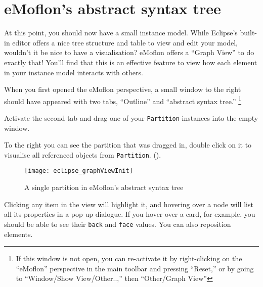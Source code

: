 \newpage
\section{eMoflon's abstract syntax tree}
\genHeader

At this point, you should now have a small instance model. While Eclipse's built-in editor offers a nice tree structure and table to view and edit your model,
wouldn't it be nice to have a visualisation? eMoflon offers a ``Graph View'' to do exactly that! You'll find that this is an effective
feature to view how each element in your instance model interacts with others.

\begin{stepbystep}

\item When you first opened the eMoflon perspective, a small window to the right should have appeared with two tabs, ``Outline'' and
``abstract syntax tree.'' \footnote{If this window is not open, you can re-activate it by right-clicking on the ``eMoflon'' perspective in the main toolbar and pressing
``Reset,'' or by going to ``Window/Show View/Other..,'' then ``Other/Graph View''} 

\item Activate the second tab and drag one of your \texttt{Partition} instances into the empty window. 

\item To the right you can see the partition that was dragged in, double click on it to visualise all referenced objects from \texttt{Partition}.
().

\vspace{0.5cm}

\begin{figure}[htbp]
	\centering
  \texttt{[image: eclipse\_graphViewInit]}
	\caption{A single partition in eMoflon's abstract syntax tree}
	\label{eclipse:graphView_init}
\end{figure}

\vspace{0.5cm}

\item Clicking any item in the view will highlight it, and hovering over a node will list all its properties in a pop-up dialogue. If you
hover over a card, for example, you should be able to see their \texttt{back} and \texttt{face} values. You can also reposition elements.

\clearpage


\end{stepbystep}
